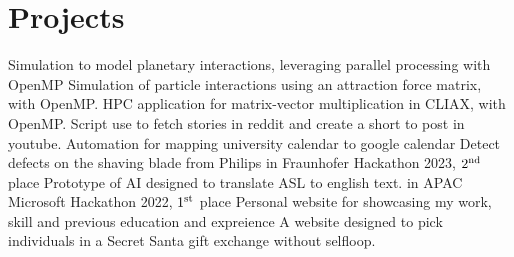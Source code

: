 \section{Projects}
\resumeSubHeadingListStart
{}
{Simulation to model planetary interactions, leveraging parallel processing with OpenMP}
{Simulation of particle interactions using an attraction force matrix, with OpenMP.}
{HPC application for matrix-vector multiplication in CLIAX, with OpenMP.}
{Script use to fetch stories in reddit and create a short to post in youtube.}
{Automation for mapping university calendar to google calendar}
{Detect defects on the shaving blade from Philips in Fraunhofer Hackathon 2023, $2\textsuperscript{nd}$ place}
{Prototype of AI designed to translate ASL to english text. in APAC Microsoft Hackathon 2022, $1\textsuperscript{st}$ place}
{Personal website for showcasing my work, skill and previous education and expreience}
{A website designed to pick individuals in a Secret Santa gift exchange without selfloop.}
\resumeSubHeadingListEnd
